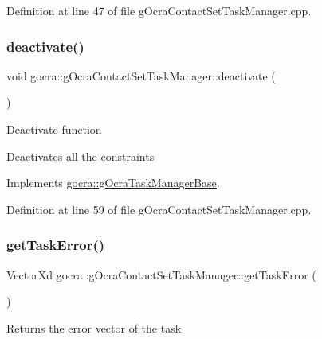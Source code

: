 Definition at line 47 of file g\+Ocra\+Contact\+Set\+Task\+Manager.\+cpp.

\hypertarget{classgocra_1_1gOcraContactSetTaskManager_ad9f3b44b46253e5539e658cf3fd8ca37}{}\label{classgocra_1_1gOcraContactSetTaskManager_ad9f3b44b46253e5539e658cf3fd8ca37} 
\subsubsection{\texorpdfstring{deactivate()}{deactivate()}}
{\footnotesize\ttfamily void gocra\+::g\+Ocra\+Contact\+Set\+Task\+Manager\+::deactivate (\begin{DoxyParamCaption}{ }\end{DoxyParamCaption})\hspace{0.3cm}{\ttfamily [virtual]}}

Deactivate function

Deactivates all the constraints 

Implements \hyperlink{classgocra_1_1gOcraTaskManagerBase_a7cf9111e69aee47a39fe0f2976a20d6c}{gocra\+::g\+Ocra\+Task\+Manager\+Base}.



Definition at line 59 of file g\+Ocra\+Contact\+Set\+Task\+Manager.\+cpp.

\hypertarget{classgocra_1_1gOcraContactSetTaskManager_aa0136e8702029873ba4d82c0edc7c571}{}\label{classgocra_1_1gOcraContactSetTaskManager_aa0136e8702029873ba4d82c0edc7c571} 
\subsubsection{\texorpdfstring{get\+Task\+Error()}{getTaskError()}}
{\footnotesize\ttfamily Vector\+Xd gocra\+::g\+Ocra\+Contact\+Set\+Task\+Manager\+::get\+Task\+Error (\begin{DoxyParamCaption}{ }\end{DoxyParamCaption})\hspace{0.3cm}{\ttfamily [virtual]}}

Returns the error vector of the task

